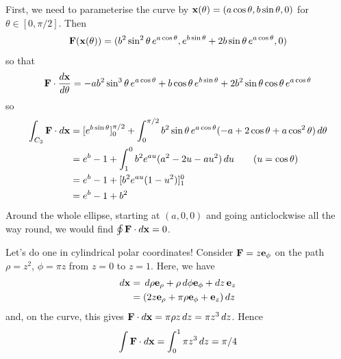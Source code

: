 \documentclass{../template/note}
\begin{document}
\begin{example*}
\begin{itemize}
            First, we need to parameterise the curve by \(\V x(\theta) = (a \cos \theta, b \sin \theta, 0)\) for \(\theta \in [0, \pi/2]\). Then
            \begin{align*}
                \V F(\V x(\theta)) = (b^2 \sin^2 \theta \, e^{a \cos \theta}, e^{b \sin \theta} + 2b \sin \theta \, e^{a \cos \theta}, 0)
            \end{align*}
            so that
            \begin{align*}
                \V F \cdot \frac{d \V x}{d \theta} = -ab^2 \sin^3 \theta \, e^{a \cos \theta} + b \cos \theta \, e^{b \sin \theta}+ 2b^2 \sin \theta \cos \theta \, e^{a \cos \theta}
            \end{align*}
            so
            \begin{align*}
                \int_{C_3} \V F \cdot d \V x &= [e^{b \sin \theta}]^{\pi/2}_0 + \int_0^{\pi/2} b^2 \sin \theta \, e^{a \cos \theta} (-a + 2 \cos \theta + a \cos^2 \theta) \D \theta \\
                &= e^b - 1 + \int_1^0 b^2 e^{au} (a^2-2u-au^2) \D u \qquad (u = \cos \theta) \\
                &= e^b - 1 + [b^2e^{au}(1-u^2)]^0_1 \\
                &= e^b - 1 + b^2
            \end{align*}
            Around the whole ellipse, starting at \((a, 0, 0)\) and going anticlockwise all the way round, we would find \(\oint \V F \cdot d \V x = 0\).
        \end{itemize}
    \end{example*}
    
    \begin{example*}
        Let's do one in cylindrical polar coordinates! Consider \(\V F = z \V e_\phi\) on the path \(\rho = z^2\), \(\phi = \pi z\) from \(z = 0\) to \(z=1\). Here, we have
        \begin{align*}
            d \V x &= \D \rho \V e_\rho + \rho \D \phi \V e_\phi + dz\, \V e_z \\
            &= (2z \V e_\rho + \pi \rho \V e_\phi + \V e_z) \D z
        \end{align*}
        and, on the curve, this gives \(\V F \cdot d \V x = \pi \rho z \D z = \pi z^3 \D z\). Hence
        \begin{align*}
            \int \V F \cdot d \V x = \int_0^1 \pi z^3 \D z = \pi/4
        \end{align*}
    \end{example*}
    
\end{document}
